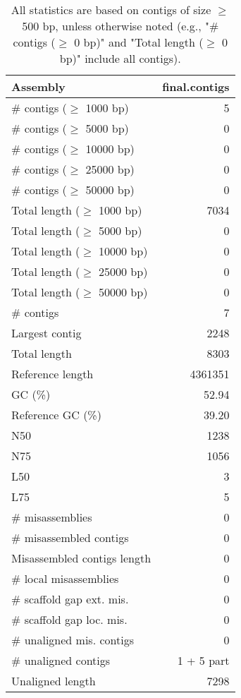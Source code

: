 \documentclass[12pt,a4paper]{article}
\begin{document}
\begin{table}[ht]
\begin{center}
\caption{All statistics are based on contigs of size $\geq$ 500 bp, unless otherwise noted (e.g., "\# contigs ($\geq$ 0 bp)" and "Total length ($\geq$ 0 bp)" include all contigs).}
\begin{tabular}{|l*{1}{|r}|}
\hline
Assembly & final.contigs \\ \hline
\# contigs ($\geq$ 1000 bp) & 5 \\ \hline
\# contigs ($\geq$ 5000 bp) & 0 \\ \hline
\# contigs ($\geq$ 10000 bp) & 0 \\ \hline
\# contigs ($\geq$ 25000 bp) & 0 \\ \hline
\# contigs ($\geq$ 50000 bp) & 0 \\ \hline
Total length ($\geq$ 1000 bp) & 7034 \\ \hline
Total length ($\geq$ 5000 bp) & 0 \\ \hline
Total length ($\geq$ 10000 bp) & 0 \\ \hline
Total length ($\geq$ 25000 bp) & 0 \\ \hline
Total length ($\geq$ 50000 bp) & 0 \\ \hline
\# contigs & 7 \\ \hline
Largest contig & 2248 \\ \hline
Total length & 8303 \\ \hline
Reference length & 4361351 \\ \hline
GC (\%) & 52.94 \\ \hline
Reference GC (\%) & 39.20 \\ \hline
N50 & 1238 \\ \hline
N75 & 1056 \\ \hline
L50 & 3 \\ \hline
L75 & 5 \\ \hline
\# misassemblies & 0 \\ \hline
\# misassembled contigs & 0 \\ \hline
Misassembled contigs length & 0 \\ \hline
\# local misassemblies & 0 \\ \hline
\# scaffold gap ext. mis. & 0 \\ \hline
\# scaffold gap loc. mis. & 0 \\ \hline
\# unaligned mis. contigs & 0 \\ \hline
\# unaligned contigs & 1 + 5 part \\ \hline
Unaligned length & 7298 \\ \hline

\end{tabular}
\end{center}
\end{table}
\end{document}
